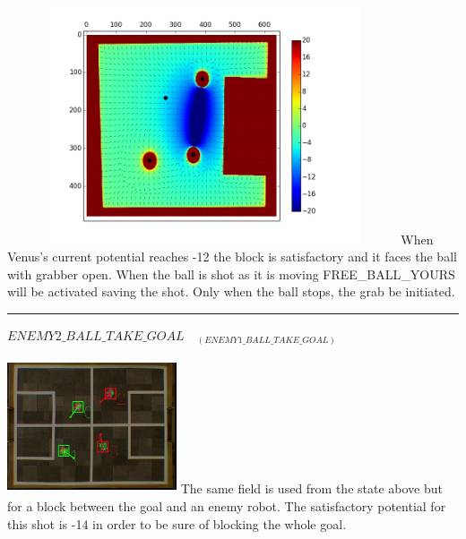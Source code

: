 \documentclass[a4paper,12pt]{article}
\begin{document}
\hspace{.2cm}
\begin{minipage}{0.5\textwidth}
\includegraphics[height=70mm,width=115mm]{p1.jpg}\newline\newline
When Venus's current potential reaches -12 the block is satisfactory and it faces the ball with grabber open. When the ball is shot as it is moving FREE\_BALL\_YOURS will be activated saving the shot. Only when the ball stops, the grab be initiated.
\end{minipage}\newline\newline
\rule{\textwidth}{1pt}\newline
$ENEMY2\_BALL\_TAKE\_GOAL\quad_{(ENEMY1\_BALL\_TAKE\_GOAL)}$ \newline \newline
\begin{minipage}{0.5\textwidth}
\includegraphics[height=40mm,width=50mm]{v1_2.jpg}\newline
The same field is used from the state above but for a block between the goal and an enemy robot. The satisfactory potential for this shot is -14 in order to be sure of blocking the whole goal.
\end{minipage}
\hspace{.2cm}
\end{document}
